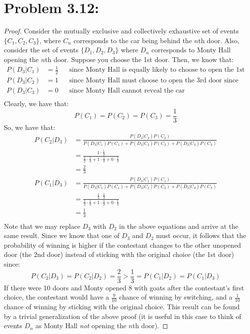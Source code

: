 \documentclass{article}
\begin{document}
\section{Problem 3.12:}
\begin{proof}
Consider the mutually exclusive and collectively exhaustive set of events $\{C_1, C_2, C_3\}$, where $C_n$ corresponds to the car being behind the $n$th door.
Also, consider the set of events $\{D_1, D_2, D_3\}$ where $D_n$ corresponds to Monty Hall opening the $n$th door.
Suppose you choose the 1st door. Then, we know that:
\begin{align*}
P(D_3 | C_1) &= \frac{1}{2} &&\text{since Monty Hall is equally likely to choose to open the 1st or the 2nd door} \\
P(D_3 | C_2) &= 1 &&\text{since Monty Hall must choose to open the 3rd door since you have chosen the 1st door} \\
P(D_3 | C_3) &= 0 &&\text{since Monty Hall cannot reveal the car} \\
\end{align*}
Clearly, we have that:
$$P(C_1) = P(C_2) = P(C_3) = \frac{1}{3}$$
So, we have that:
\begin{align*}
P(C_2 | D_3) &= \frac{P(D_3 | C_2) P(C_2)}{P(D_3 | C_1) P(C_1) + P(D_3 | C_2) P(C_2) + P(D_3 | C_3) P(C_3)} \\
&= \frac{1 \cdot \frac{1}{3}}{\frac{1}{2} \cdot \frac{1}{3} + 1 \cdot \frac{1}{3} + 0 \cdot \frac{1}{3}} \\
&= \frac{2}{3} \\
P(C_1 | D_3) &= \frac{P(D_3 | C_1) P(C_1)}{P(D_3 | C_1) P(C_1) + P(D_3 | C_2) P(C_2) + P(D_3 | C_3) P(C_3)} \\
&= \frac{\frac{1}{2} \cdot \frac{1}{3}}{\frac{1}{2} \cdot \frac{1}{3} + 1 \cdot \frac{1}{3} + 0 \cdot \frac{1}{3}} \\
&= \frac{1}{3} \\
\end{align*}
Note that we may replace $D_3$ with $D_2$ in the above equations and arrive at the same result. Since we know that one of $D_3$ and $D_2$ must occur, it follows that the probability of winning is higher if the contestant changes to the other unopened door (the 2nd door) instead of sticking with the original choice (the 1st door) since:
$$P(C_2 | D_3) = P(C_2 | D_2) = \frac{2}{3} > \frac{1}{3} = P(C_1 | D_2) = P(C_1 | D_3)$$
If there were 10 doors and Monty opened 8 with goats after the contestant's first choice, the contestant would have a $\frac{9}{10}$ chance of winning by switching, and a $\frac{1}{10}$ chance of winning by sticking with the original choice. This result can be found by a trivial generalization of the above proof (it is useful in this case to think of events $D_n$ as Monty Hall {\it not} opening the $n$th door).
\end{proof}
\end{document}
